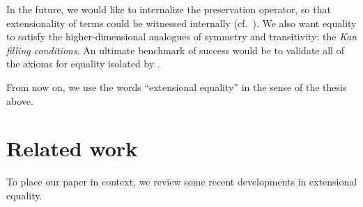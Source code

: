 \documentclass[10pt]{article}
\begin{document}
In the future, we would like to internalize the preservation operator, so that
extensionality of terms could be witnessed internally (cf.\ \cite{intpar}).
We also want equality to satisfy the higher-dimensional analogues
of symmetry and transitivity: the \emph{Kan filling conditions}.
An ultimate benchmark of success would be to validate all
of the axioms for equality isolated by \cite[p.34]{coquand}.

From now on, we use the words ``extensional equality''
in the sense of the thesis above.

\section{Related work}

To place our paper in context, we review some recent developments in
extensional equality.
\end{document}
